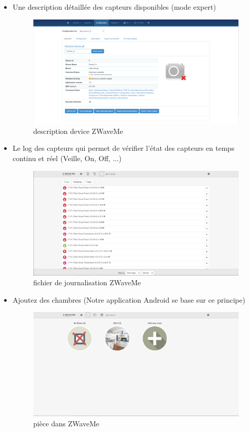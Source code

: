 \begin{itemize}
\item Une description détaillée des capteurs disponibles (mode expert)

\begin{figure}[h]
	\center
\includegraphics[scale=0.4]{./Images/png/description_zwaveme.png}
	\caption{description device ZWaveMe}
\end{figure}
\clearpage


\clearpage
\item Le log des capteurs qui permet de vérifier l'état des capteurs en temps continu et réel (Veille, On, Off, ...)


\begin{figure}[h]
	\center
\includegraphics[scale=0.4]{./Images/png/log_zwaveme.png}
	\caption{fichier de journalisation ZWaveMe}
\end{figure}
\clearpage

\item Ajoutez des chambres (Notre application Android se base sur ce principe)

\begin{figure}[h]
	\center
\includegraphics[scale=0.4]{./Images/png/room_zwaveme.png}\newline
	\caption{pièce dans ZWaveMe}
\end{figure}
\clearpage


\end{itemize}
